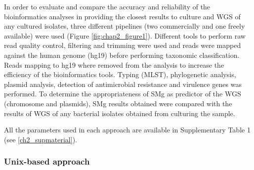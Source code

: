 In order to evaluate and compare the accuracy and reliability of the bioinformatics analyses in providing the closest results to culture and \ac{WGS} of any cultured isolates, three different pipelines (two commercially and one freely available) were used (Figure \ref{fig:chap2_figure1}).
Different tools to perform raw read quality control, filtering and trimming were used and reads were mapped against the human genome (hg19) before performing taxonomic classification. 
Reads mapping to hg19 where removed from the analysis to increase the efficiency of the bioinformatics tools. 
Typing (MLST), phylogenetic analysis, plasmid analysis, detection of antimicrobial resistance and virulence genes was performed. 
To determine the appropriateness of \ac{SMg} as predictor of the \ac{WGS} (chromosome and plasmids), \ac{SMg} results obtained were compared with the results of \ac{WGS} of any bacterial isolates obtained from culturing the sample.

All the parameters used in each approach are available in Supplementary Table 1 (see \ref{ch2_supmaterial}).

\subsubsection{Unix-based approach}

